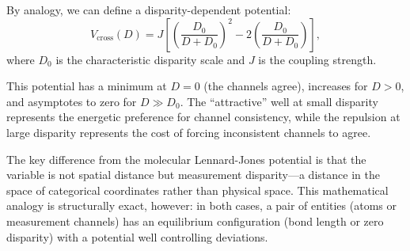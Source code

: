 \documentclass[11pt,twocolumn,a4paper]{article}
\begin{document}
By analogy, we can define a disparity-dependent potential:
\begin{equation}
V_{\mathrm{cross}}(D) = J\left[\left(\frac{D_0}{D + D_0}\right)^{2} - 2\left(\frac{D_0}{D + D_0}\right)\right],
\end{equation}
where $D_0$ is the characteristic disparity scale and $J$ is the coupling strength.

This potential has a minimum at $D = 0$ (the channels agree), increases for $D > 0$, and asymptotes to zero for $D \gg D_0$.
The ``attractive'' well at small disparity represents the energetic preference for channel consistency, while the repulsion at large disparity represents the cost of forcing inconsistent channels to agree.

The key difference from the molecular Lennard-Jones potential is that the variable is not spatial distance but measurement disparity---a distance in the space of categorical coordinates rather than physical space.
This mathematical analogy is structurally exact, however: in both cases, a pair of entities (atoms or measurement channels) has an equilibrium configuration (bond length or zero disparity) with a potential well controlling deviations.




\end{document}
